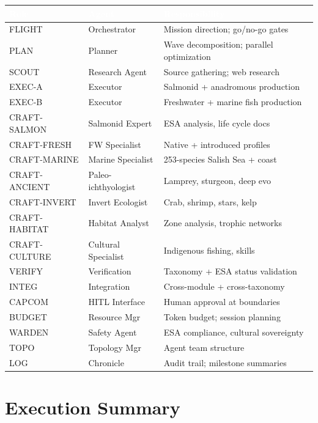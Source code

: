 \documentclass[11pt,letterpaper]{article}
\newcommand{\tableheader}[1]{\textbf{\sffamily\textcolor{white}{#1}}}
\begin{document}
\begin{center}
\begin{tabularx}{\textwidth}{L{2cm}L{2.5cm}X}
\toprule
{}
\tableheader{Role} & \tableheader{Agent} & \tableheader{Responsibility} \\
\midrule
FLIGHT & Orchestrator & Mission direction; go/no-go gates \\
PLAN & Planner & Wave decomposition; parallel optimization \\
SCOUT & Research Agent & Source gathering; web research \\
EXEC-A & Executor & Salmonid + anadromous production \\
EXEC-B & Executor & Freshwater + marine fish production \\
CRAFT-SALMON & Salmonid Expert & ESA analysis, life cycle docs \\
CRAFT-FRESH & FW Specialist & Native + introduced profiles \\
CRAFT-MARINE & Marine Specialist & 253-species Salish Sea + coast \\
CRAFT-ANCIENT & Paleo-ichthyologist & Lamprey, sturgeon, deep evo \\
CRAFT-INVERT & Invert Ecologist & Crab, shrimp, stars, kelp \\
CRAFT-HABITAT & Habitat Analyst & Zone analysis, trophic networks \\
CRAFT-CULTURE & Cultural Specialist & Indigenous fishing, skills \\
VERIFY & Verification & Taxonomy + ESA status validation \\
INTEG & Integration & Cross-module + cross-taxonomy \\
CAPCOM & HITL Interface & Human approval at boundaries \\
BUDGET & Resource Mgr & Token budget; session planning \\
WARDEN & Safety Agent & ESA compliance, cultural sovereignty \\
TOPO & Topology Mgr & Agent team structure \\
LOG & Chronicle & Audit trail; milestone summaries \\
\bottomrule
\end{tabularx}
\end{center}

\section{Execution Summary}
\end{document}
